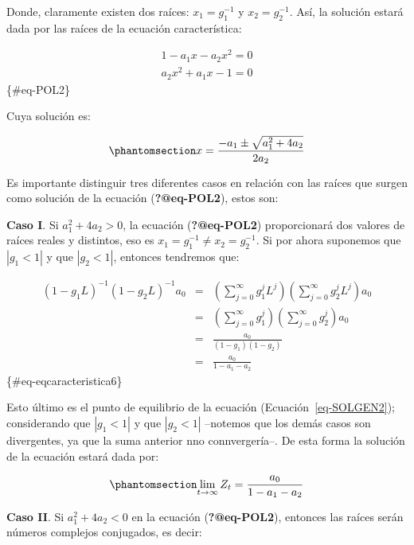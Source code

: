 \documentclass[
  a4paper,
]{article}
\begin{document}
Donde, claramente existen dos raíces: \(x_1 = g^{-1}_1\) y
\(x_2 = g^{-1}_2\). Así, la solución estará dada por las raíces de la
ecuación característica:

\begin{eqnarray}
    1 - a_1 x - a_2 x^2 = 0 \nonumber \\
    a_2 x^2 + a_1 x - 1 = 0
\end{eqnarray} \{\#eq-POL2\}

Cuya solución es:

\begin{equation}\phantomsection\label{eq-eqcaracteristica5}{
    x = \frac{- a_1 \pm \sqrt{a^2_1 + 4 a_2}}{2 a_2}
}\end{equation}

Es importante distinguir tres diferentes casos en relación con las
raíces que surgen como solución de la ecuación (\textbf{?@eq-POL2}),
estos son:

\textbf{Caso I}. Si \(a^2_1 + 4 a_2 > 0\), la ecuación
(\textbf{?@eq-POL2}) proporcionará dos valores de raíces reales y
distintos, eso es \(x_1 = g^{-1}_1 \neq x_2 = g^{-1}_2\). Si por ahora
suponemos que \(|{g_1} < 1|\) y que \(|{g_2} < 1|\), entonces tendremos
que:

\begin{eqnarray}
    (1 - g_1 L)^{-1} (1 - g_2 L)^{-1} a_0 & =&  \left( \sum^{\infty}_{j = 0}{g^j_1 L^j} \right) \left( \sum^{\infty}_{j = 0}{g^j_2 L^j} \right) a_0 \nonumber \\
    & = & \left( \sum^{\infty}_{j = 0}{g^j_1} \right) \left( \sum^{\infty}_{j = 0}{g^j_2} \right) a_0 \nonumber \\
    & = & \frac{a_0}{(1 - g_1)(1 - g_2)} \nonumber \\
    & = & \frac{a_0}{1 - a_1 - a_2}
\end{eqnarray} \{\#eq-eqcaracteristica6\}

Esto último es el punto de equilibrio de la ecuación
(Ecuación~\ref{eq-SOLGEN2}); considerando que \(|{g_1} < 1|\) y que
\(|{g_2} < 1|\) --notemos que los demás casos son divergentes, ya que la
suma anterior nno connvergería--. De esta forma la solución de la
ecuación estará dada por:

\begin{equation}\phantomsection\label{eq-Conver}{
    \lim_{t \to \infty} Z_t = \frac{a_0}{1 - a_1 - a_2}
}\end{equation}

\textbf{Caso II}. Si \(a_1^2 + 4a_2 < 0\) en la ecuación
(\textbf{?@eq-POL2}), entonces las raíces serán números complejos
conjugados, es decir:
\end{document}
